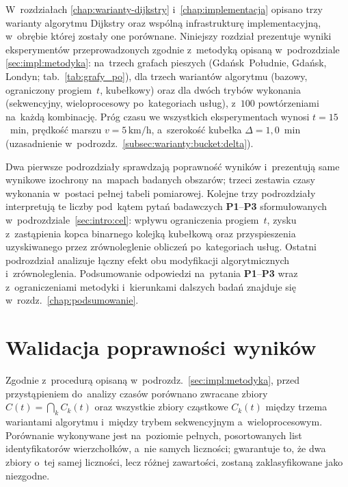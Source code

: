 \label{chap:wyniki}

W~rozdziałach \ref{chap:warianty-dijkstry} i~\ref{chap:implementacja} opisano
trzy warianty algorytmu Dijkstry oraz wspólną infrastrukturę implementacyjną,
w~obrębie której zostały one porównane. Niniejszy rozdział prezentuje wyniki
eksperymentów przeprowadzonych zgodnie z~metodyką opisaną w~podrozdziale
\ref{sec:impl:metodyka}: na~trzech grafach pieszych
(Gdańsk~Południe, Gdańsk, Londyn; tab.~\ref{tab:grafy_po}), dla trzech wariantów
algorytmu (bazowy, ograniczony progiem~$t$, kubełkowy) oraz dla dwóch trybów
wykonania (sekwencyjny, wieloprocesowy po~kategoriach usług), z~$100$
powtórzeniami na~każdą kombinację. Próg czasu we wszystkich eksperymentach
wynosi $t=15$~min, prędkość marszu $v=5\,\mathrm{km/h}$, a~szerokość kubełka
$\Delta=1{,}0$~min (uzasadnienie w~podrozdz.~\ref{subsec:warianty:bucket:delta}).

Dwa pierwsze podrozdziały sprawdzają poprawność wyników i~prezentują same
wynikowe izochrony na~mapach badanych obszarów; trzeci zestawia czasy
wykonania w~postaci pełnej tabeli pomiarowej. Kolejne trzy podrozdziały
interpretują te liczby pod~kątem pytań badawczych
\textbf{P1}--\textbf{P3} sformułowanych w~podrozdziale~\ref{sec:intro:cel}:
wpływu ograniczenia progiem~$t$, zysku z~zastąpienia kopca binarnego kolejką
kubełkową oraz przyspieszenia uzyskiwanego przez zrównoleglenie obliczeń
po~kategoriach usług. Ostatni podrozdział analizuje łączny efekt obu modyfikacji
algorytmicznych i~zrównoleglenia. Podsumowanie odpowiedzi
na~pytania \textbf{P1}--\textbf{P3} wraz z~ograniczeniami metodyki
i~kierunkami dalszych badań znajduje się w~rozdz.~\ref{chap:podsumowanie}.

\section{Walidacja poprawności wyników}
\label{sec:wyniki:poprawnosc}

Zgodnie z~procedurą opisaną w~podrozdz.~\ref{sec:impl:metodyka},
przed przystąpieniem do~analizy czasów porównano zwracane zbiory
$C(t)=\bigcap_k C_k(t)$ oraz wszystkie zbiory cząstkowe $C_k(t)$
między trzema wariantami algorytmu i~między trybem sekwencyjnym
a~wieloprocesowym. Porównanie wykonywane jest na~poziomie pełnych,
posortowanych list identyfikatorów wierzchołków, a~nie samych liczności;
gwarantuje to, że dwa zbiory o~tej samej liczności, lecz różnej zawartości,
zostaną zaklasyfikowane jako niezgodne.

\clearpage

